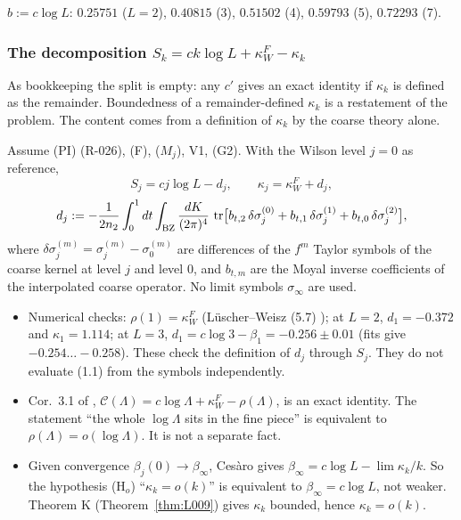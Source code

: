 $b:=c\log L$: $0.25751$ ($L=2$), $0.40815$ (3), $0.51502$ (4), $0.59793$ (5), $0.72293$ (7).

\subsubsection{The decomposition $S_k=ck\log L+\kappa_W^F-\kappa_k$}\label{sec:decomp}

As bookkeeping the split is empty: any $c'$ gives an exact identity if $\kappa_k$ is defined as the remainder. Boundedness of a remainder-defined $\kappa_k$ is a restatement of the problem. The content comes from a definition of $\kappa_k$ by the coarse theory alone.

\begin{proposition}
Assume (PI) (R-026), (F), ($M_j$), V1, (G2). With the Wilson level $j=0$ as reference,
\[
S_j=cj\log L-d_j,\qquad \kappa_j=\kappa_W^F+d_j,
\]
\[
d_j:=-\frac{1}{2n_2}\int_0^1dt\int_{\mathrm{BZ}}\frac{dK}{(2\pi)^4}\,\operatorname{tr}\bigl[b_{t,2}\,\delta\sigma_j^{(0)}+b_{t,1}\,\delta\sigma_j^{(1)}+b_{t,0}\,\delta\sigma_j^{(2)}\bigr],
\]
where $\delta\sigma_j^{(m)}=\sigma_j^{(m)}-\sigma_0^{(m)}$ are differences of the $f^m$ Taylor symbols of the coarse kernel at level $j$ and level 0, and $b_{t,m}$ are the Moyal inverse coefficients of the interpolated coarse operator. No limit symbols $\sigma_\infty$ are used.
\end{proposition}
\begin{itemize}
\item Numerical checks: $\rho(1)=\kappa_W^F$ (L\"uscher--Weisz (5.7) \cite{luscherweisz1995}); at $L=2$, $d_1=-0.372$ and $\kappa_1=1.114$; at $L=3$, $d_1=c\log3-\beta_1=-0.256\pm0.01$ (fits give $-0.254\dots-0.258$). These check the definition of $d_j$ through $S_j$. They do not evaluate (1.1) from the symbols independently.
\item Cor.\ 3.1 of , $\mathcal C(\Lambda)=c\log\Lambda+\kappa_W^F-\rho(\Lambda)$, is an exact identity. The statement ``the whole $\log\Lambda$ sits in the fine piece'' is equivalent to $\rho(\Lambda)=o(\log\Lambda)$. It is not a separate fact.
\item Given convergence $\beta_j(0)\to\beta_\infty$, Ces\`aro gives $\beta_\infty=c\log L-\lim\kappa_k/k$. So the hypothesis (H$_o$) ``$\kappa_k=o(k)$'' is equivalent to $\beta_\infty=c\log L$, not weaker. Theorem K (Theorem~\ref{thm:L009}) gives $\kappa_k$ bounded, hence $\kappa_k=o(k)$.
\end{itemize}


